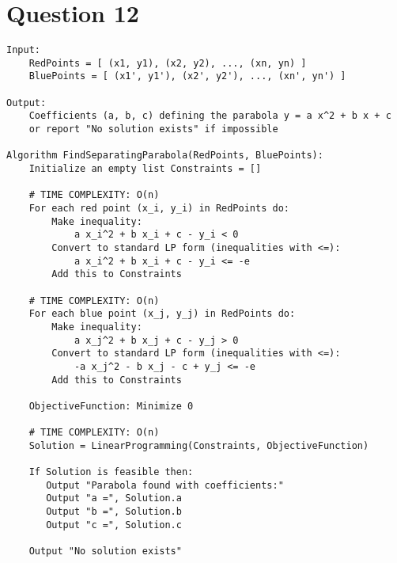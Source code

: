 \documentclass{article}
\begin{document}
\section*{Question 12}
\begin{verbatim}
Input: 
    RedPoints = [ (x1, y1), (x2, y2), ..., (xn, yn) ]
    BluePoints = [ (x1', y1'), (x2', y2'), ..., (xn', yn') ]

Output:
    Coefficients (a, b, c) defining the parabola y = a x^2 + b x + c
    or report "No solution exists" if impossible

Algorithm FindSeparatingParabola(RedPoints, BluePoints): 
    Initialize an empty list Constraints = []

    # TIME COMPLEXITY: O(n)
    For each red point (x_i, y_i) in RedPoints do:
        Make inequality:
            a x_i^2 + b x_i + c - y_i < 0
        Convert to standard LP form (inequalities with <=):
            a x_i^2 + b x_i + c - y_i <= -e
        Add this to Constraints

    # TIME COMPLEXITY: O(n)
    For each blue point (x_j, y_j) in RedPoints do:
        Make inequality:
            a x_j^2 + b x_j + c - y_j > 0
        Convert to standard LP form (inequalities with <=):
            -a x_j^2 - b x_j - c + y_j <= -e
        Add this to Constraints

    ObjectiveFunction: Minimize 0

    # TIME COMPLEXITY: O(n)
    Solution = LinearProgramming(Constraints, ObjectiveFunction)

    If Solution is feasible then:
       Output "Parabola found with coefficients:"
       Output "a =", Solution.a
       Output "b =", Solution.b
       Output "c =", Solution.c

    Output "No solution exists"

\end{verbatim}
\end{document}
